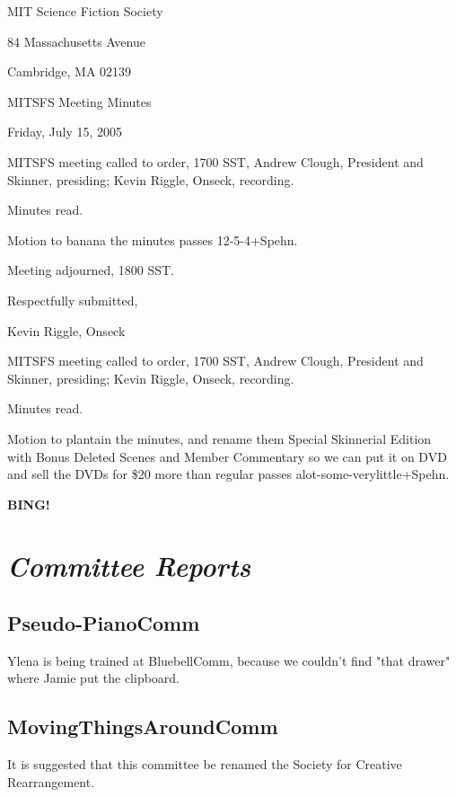 \documentclass[10pt]{article}
\newcommand{\bing}{{\bf BING!} }
\newcommand{\goto}[1]{\bing \vskip 12pt \section*{{\em{#1}}}}
\begin{document}
\begin{center}

MIT Science Fiction Society

84 Massachusetts Avenue

Cambridge, MA 02139

\vspace{12pt}

MITSFS Meeting Minutes

Friday, July 15, 2005

\end{center}

\vspace{18pt}

\setlength{\parskip}{6pt}

\noindent
MITSFS meeting called to order, 1700 SST, Andrew Clough, President and
Skinner, presiding; Kevin Riggle,  Onseck, recording.

Minutes read.

Motion to banana the minutes passes 12-5-4+Spehn.

Meeting adjourned, 1800 SST.

\vspace{18pt}

\centerline{Respectfully submitted,}
\centerline{Kevin Riggle, Onseck}

\vspace{18pt}

\setlength{\parskip}{6pt}

\noindent
MITSFS meeting called to order, 1700 SST, Andrew Clough, President and
Skinner, presiding; Kevin Riggle,  Onseck, recording.

Minutes read.

Motion to plantain the minutes, and rename them Special Skinnerial Edition with Bonus Deleted Scenes and Member Commentary so we can put it on DVD and sell the DVDs for \$20 more than regular passes alot-some-verylittle+Spehn.

\goto{Committee Reports}

\subsection*{Pseudo-PianoComm}
Ylena is being trained at BluebellComm, because we couldn't find "that drawer" where Jamie put the clipboard.

\subsection*{MovingThingsAroundComm}
It is suggested that this committee be renamed the Society for Creative Rearrangement.
\end{document}
